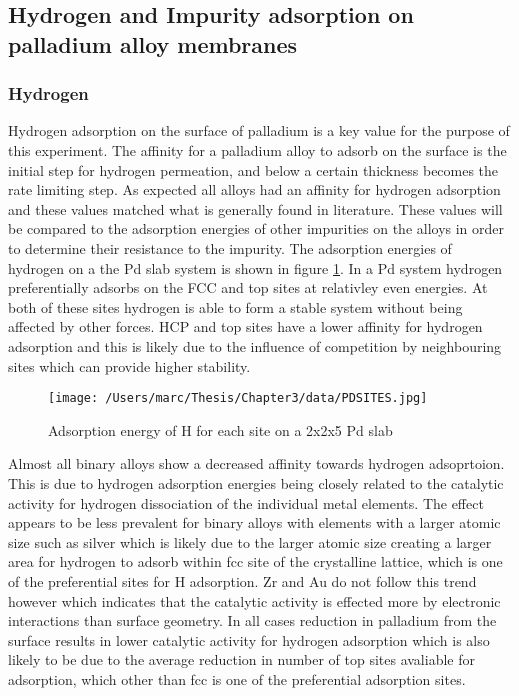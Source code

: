 \subsection{Hydrogen and Impurity adsorption on palladium alloy membranes}
\subsubsection{Hydrogen}
Hydrogen adsorption on the surface of palladium is a key value for the purpose of this experiment. The affinity for a palladium alloy to adsorb on the surface is the initial step for hydrogen permeation, and below a certain thickness becomes the rate limiting step. As expected all alloys had an affinity for hydrogen adsorption and these values matched what is generally found in literature. These values will be compared to the adsorption energies of other impurities on the alloys in order to determine their resistance to the impurity. The adsorption energies of hydrogen on a the Pd slab system is shown in figure \ref{Pdsite}. In a Pd system hydrogen preferentially adsorbs on the FCC and top sites at relativley even energies. At both of these sites hydrogen is able to form a stable system without being affected by other forces. HCP and top sites have a  lower affinity for hydrogen adsorption and this is likely due to the influence of competition by neighbouring sites which can provide higher stability.

\begin{figure}
  \centering
  \texttt{[image: /Users/marc/Thesis/Chapter3/data/PDSITES.jpg]}
  \caption{Adsorption energy of H for each site on a 2x2x5 Pd slab}
  \label{Pdsite}
\end{figure}

Almost all binary alloys show a decreased affinity towards hydrogen adsoprtoion. This is due to hydrogen adsorption energies being closely related to the catalytic activity for hydrogen dissociation of the individual metal elements. The effect appears to be less prevalent for binary alloys with elements with a larger atomic size such as silver which is likely due to the larger atomic size creating a larger area for hydrogen to adsorb within fcc site of the crystalline lattice, which is one of the preferential sites for H adsorption. Zr and Au do not follow this trend however which indicates that the catalytic activity is effected more by electronic interactions than surface geometry. In all cases reduction in palladium from the surface results in lower catalytic activity for hydrogen adsorption which is also likely to be due to the average reduction in number of top sites avaliable for adsorption, which other than fcc is one of the preferential adsorption sites. 

